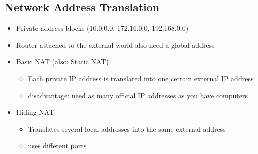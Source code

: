 \documentclass[11pt,ngerman]{article}
\begin{document}
\subsection{Network	Address	Translation}

\begin{itemize}[noitemsep,nolistsep]
\item Private address blocks  (10.0.0.0, 172.16.0.0, 192.168.0.0)
\item Router attached to the external world also need a global address
\item Basic	NAT	(also:	Static	NAT)
	\begin{itemize}[noitemsep,nolistsep]
	\item Each	private	IP	address	is	translated	into	one	certain	external	IP	address
	\item disadvantage: need as many official IP addresses as you have computers
	\end{itemize}
\item Hiding	NAT
	\begin{itemize}[noitemsep,nolistsep]
	\item Translates	several	local	addresses	into	the	same	external	address
	\item uses different ports
	\end{itemize}
\end{itemize}
\end{document}
